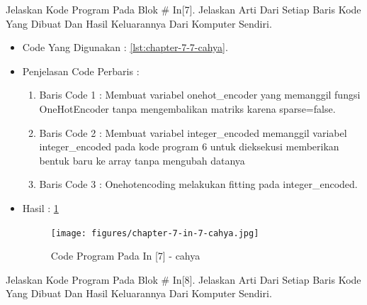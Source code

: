 \par
\par
\item Jelaskan Kode Program Pada Blok \# In[7]. Jelaskan Arti Dari Setiap Baris Kode Yang Dibuat Dan Hasil Keluarannya Dari Komputer Sendiri.
\begin{itemize}
\item Code Yang Digunakan : \ref{lst:chapter-7-7-cahya}.

\par
\par
\item Penjelasan Code Perbaris	: 
\begin{enumerate}
\item Baris Code 1	: Membuat variabel onehot\_encoder yang memanggil fungsi OneHotEncoder tanpa mengembalikan matriks karena sparse=false.
\item Baris Code 2	: Membuat variabel integer\_encoded memanggil variabel integer\_encoded pada kode program 6 untuk dieksekusi memberikan bentuk baru ke array tanpa mengubah datanya 
\item Baris Code 3	: Onehotencoding melakukan fitting pada integer\_encoded.
\end{enumerate}
\item Hasil : \ref{chapter-7-in-7-cahya}
\par
\par
\begin{figure}[!hbtp]
\centering
\texttt{[image: figures/chapter-7-in-7-cahya.jpg]}
\caption{Code Program Pada In [7] - cahya}
\label{chapter-7-in-7-cahya}
\end{figure}
\par
\par
\end{itemize}
\par
\par
\par
\item Jelaskan Kode Program Pada Blok \# In[8]. Jelaskan Arti Dari Setiap Baris Kode Yang Dibuat Dan Hasil Keluarannya Dari Komputer Sendiri.
